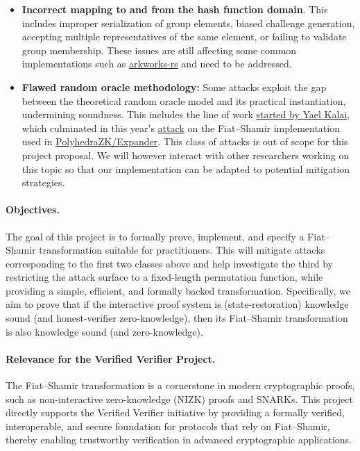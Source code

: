 \documentclass{article}
\begin{document}
\begin{itemize}
    \item \textbf{Incorrect mapping to and from the hash function domain}. This includes improper serialization of group elements, biased challenge generation, accepting multiple representatives of the same element, or failing to validate group membership. These issues are still affecting some common implementations such as \href{https://github.com/arkworks-rs/crypto-primitives/blob/main/crypto-primitives/src/snark/constraints.rs#L163}{arkworks-rs} and need to be addressed.

    \item \textbf{Flawed random oracle methodology:} Some attacks exploit the gap between the theoretical random oracle model and its practical instantiation, undermining soundness. This includes the line of work \href{https://dl.acm.org/doi/10.5555/946243.946302}{started by Yael Kalai}, which culminated in this year's \href{https://eprint.iacr.org/2025/118}{attack} on the Fiat--Shamir implementation used in \href{https://github.com/PolyhedraZK/Expander/}{PolyhedraZK/Expander}. This class of attacks is out of scope for this project proposal. We will however interact with other researchers working on this topic so that our implementation can be adapted to potential mitigation strategies.
\end{itemize}


\paragraph{Objectives.}
The goal of this project is to formally prove, implement, and specify a Fiat--Shamir transformation suitable for practitioners. This will mitigate attacks corresponding to the first two classes above and help investigate the third by restricting the attack surface to a fixed-length permutation function, while providing a simple, efficient, and formally backed transformation.
Specifically, we aim to prove that if the interactive proof system is (state-restoration) knowledge sound (and honest-verifier zero-knowledge), then its Fiat--Shamir transformation is also knowledge sound (and zero-knowledge).



\paragraph{Relevance for the Verified Verifier Project.} The Fiat--Shamir transformation is a cornerstone in modern cryptographic proofs, such as non-interactive zero-knowledge (NIZK) proofs and SNARKs. This project directly supports the Verified Verifier initiative by providing a formally verified, interoperable, and secure foundation for protocols that rely on Fiat--Shamir, thereby enabling trustworthy verification in advanced cryptographic applications.
\end{document}
